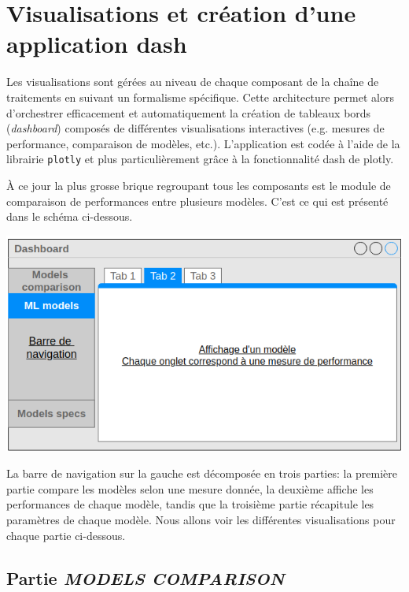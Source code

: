 \section{Visualisations et création d’une application dash}

Les visualisations sont gérées au niveau de chaque composant de la chaîne de traitements en suivant
un formalisme spécifique. Cette architecture
permet alors d'orchestrer efficacement et automatiquement la création de tableaux bords
(\textit{dashboard}) composés de différentes visualisations interactives (e.g. mesures de
performance, comparaison de modèles, etc.). L’application est codée à l’aide de la librairie \texttt{plotly} et plus particulièrement grâce à la fonctionnalité dash de plotly.

À ce jour la plus grosse brique regroupant tous les composants est le module de comparaison de
performances entre plusieurs modèles.
C’est ce qui est présenté dans le schéma ci-dessous.


\begin{center}
\includegraphics[scale=0.55]{figures/schema_app.png}
\label{fig15}
\end{center}

La barre de navigation sur la gauche est décomposée en trois parties: la première partie compare les modèles selon une mesure donnée, la deuxième affiche les performances de chaque modèle, tandis que la troisième partie récapitule les paramètres de chaque modèle. Nous allons voir les différentes visualisations pour chaque partie ci-dessous.

\subsection{Partie \textit{MODELS COMPARISON}}


